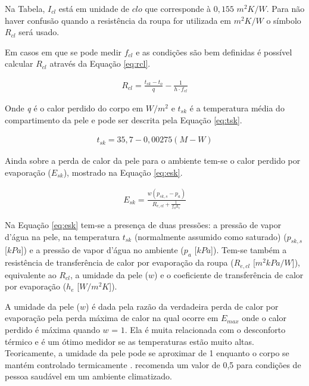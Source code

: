 \documentclass[acronym,symbols,table]{fei}
\begin{document}
Na Tabela, $I_{cl}$ está em unidade de $clo$ que corresponde à $0,155$ $m^2K/W$. Para não haver confusão quando a resistência da roupa for utilizada em $m^2K/W$ o símbolo $R_{cl}$ será usado.

Em casos em que se pode medir $f_{cl}$ e as condições são bem definidas é possível calcular $R_{cl}$ através da Equação \ref{eq:rcl}.

\begin{equation} \label{eq:rcl}
    \begin{aligned}
   R_{cl}= \frac{t_{sk}-t_{o}}{q}-\frac{1}{h\cdot f_{cl}}
    \end{aligned}
\end{equation}

Onde \textit{q} é o calor perdido do corpo em $W/m^2$ e $t_{sk}$ é a temperatura média do compartimento da pele e pode ser descrita pela Equação \ref{eq:tsk}.

\begin{equation} \label{eq:tsk}
    \begin{aligned}
   t_{sk}= 35,7 - 0,00275(M-W)
    \end{aligned}
\end{equation}

Ainda sobre a perda de calor da pele para o ambiente tem-se o calor perdido por evaporação ($E_{sk}$), mostrado na Equação \ref{eq:esk}.

\begin{equation} \label{eq:esk}
    \begin{aligned}
   E_{sk}= \frac{w(p_{sk,s}-p_{a})}{R_{e,cl}+\frac{1}{f_{cl}h_{e}}}
    \end{aligned}
\end{equation}

Na Equação \ref{eq:esk} tem-se a presença de duas pressões: a pressão de vapor d'água na pele, na temperatura $t_{sk}$ (normalmente assumido como saturado) ($p_{sk,s}$ [$kPa$]) e a pressão de vapor d'água no ambiente ($p_{a}$ [$kPa$]). Tem-se também a resistência de transferência de calor por evaporação da roupa ($R_{e,cl}$ [$m^2kPa/W$]), equivalente ao $R_{cl}$, a umidade da pele ($w$) e o coeficiente de transferência de calor por evaporação ($h_{e}$ [$W/m^2K$]).

A umidade da pele ($w$) é dada pela razão da verdadeira perda de calor por evaporação pela perda máxima de calor na qual ocorre em $E_{max}$ onde o calor perdido é máxima quando $w$ = $1$. Ela é muita relacionada com o desconforto térmico e é um ótimo medidor se as temperaturas estão muito altas. Teoricamente, a umidade da pele pode se aproximar de 1 enquanto o corpo se mantém controlado termicamente \cite{berglund1977evaporation}. \textcite{azer1982design} recomenda um valor de 0,5 para condições de pessoa saudável em um ambiente climatizado.
\end{document}
